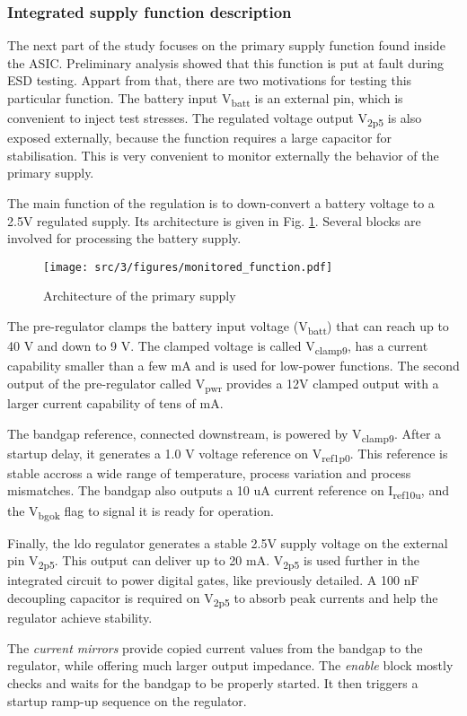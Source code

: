 \subsubsection{Integrated supply function description}
\label{sec:supply-desc}

The next part of the study focuses on the primary supply function found inside the ASIC.
Preliminary analysis showed that this function is put at fault during ESD testing.
Appart from that, there are two motivations for testing this particular function.
The battery input V\textsubscript{batt} is an external pin, which is convenient to inject test stresses.
The regulated voltage output V\textsubscript{2p5} is also exposed externally, because the function requires a large capacitor for stabilisation.
This is very convenient to monitor externally the behavior of the primary supply.

The main function of the regulation is to down-convert a battery voltage to a 2.5V regulated supply.
Its architecture is given in Fig. \ref{fig:monitored_function}.
Several blocks are involved for processing the battery supply.

\begin{figure}[!h]
  \centering
  \texttt{[image: src/3/figures/monitored\_function.pdf]}
  \caption{Architecture of the primary supply}
  \label{fig:monitored_function}
\end{figure}

The pre-regulator clamps the battery input voltage (V\textsubscript{batt}) that can reach up to 40 V and down to 9 V.
The clamped voltage is called V\textsubscript{clamp9}, has a current capability smaller than a few mA and is used for low-power functions.
The second output of the pre-regulator called V\textsubscript{pwr} provides a 12V clamped output with a larger current capability of tens of mA.

The bandgap reference, connected downstream, is powered by V\textsubscript{clamp9}.
After a startup delay, it generates a 1.0 V voltage reference on V\textsubscript{ref1p0}.
This reference is stable accross a wide range of temperature, process variation and process mismatches.
The bandgap also outputs a 10 uA current reference on I\textsubscript{ref10u}, and the V\textsubscript{bgok} flag to signal it is ready for operation.

Finally, the \gls{ldo} regulator generates a stable 2.5V supply voltage on the external pin V\textsubscript{2p5}.
This output can deliver up to 20 mA.
V\textsubscript{2p5} is used further in the integrated circuit to power digital gates, like previously detailed.
A 100 nF decoupling capacitor is required on V\textsubscript{2p5} to absorb peak currents and help the regulator achieve stability.

The \textit{current mirrors} provide copied current values from the bandgap to the regulator, while offering much larger output impedance.
The \textit{enable} block mostly checks and waits for the bandgap to be properly started.
It then triggers a startup ramp-up sequence on the regulator.
